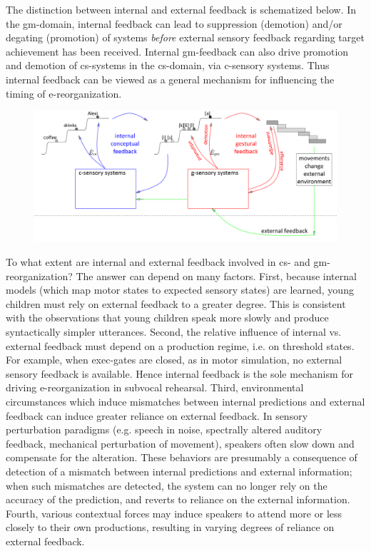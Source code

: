 The distinction between internal and external feedback is schematized below. In the gm-domain, internal feedback can lead to suppression (demotion) and/or degating (promotion) of systems \textit{before} external sensory feedback regarding target achievement has been received. Internal gm-feedback can also drive promotion and demotion of cs-systems in the cs-domain, via c-sensory systems. Thus internal feedback can be viewed as a general mechanism for influencing the timing of e-reorganization.

  
\begin{figure}
\includegraphics[width=\textwidth]{figures/Tilsen-img57.png}
\caption{\missingcaption}
\label{fig:4:7}
\end{figure}
       

  To what extent are internal and external feedback involved in cs- and gm- reorganization? The answer can depend on many factors. First, because internal models (which map motor states to expected sensory states) are learned, young children must rely on external feedback to a greater degree. This is consistent with the observations that young children speak more slowly and produce syntactically simpler utterances. Second, the relative influence of internal vs. external feedback must depend on a production regime, i.e. on threshold states. For example, when exec-gates are closed, as in motor simulation, no external sensory feedback is available. Hence internal feedback is the sole mechanism for driving e-reorganization in subvocal rehearsal. Third, environmental circumstances which induce mismatches between internal predictions and external feedback can induce greater reliance on external feedback. In sensory perturbation paradigms (e.g. speech in noise, spectrally altered auditory feedback, mechanical perturbation of movement), speakers often slow down and compensate for the alteration. These behaviors are presumably a consequence of detection of a mismatch between internal predictions and external information; when such mismatches are detected, the system can no longer rely on the accuracy of the prediction, and reverts to reliance on the external information. Fourth, various contextual forces may induce speakers to attend more or less closely to their own productions, resulting in varying degrees of reliance on external feedback.

